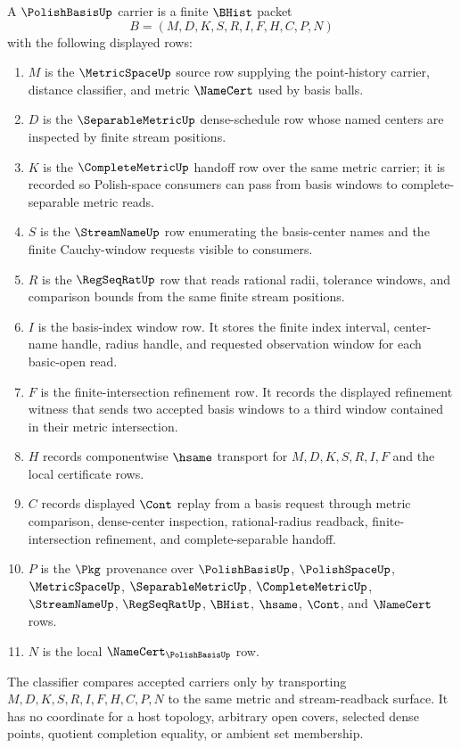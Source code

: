 \begin{definition}
\label{def:polish-basis-carrier}
A $\PolishBasisUp$ carrier is a finite $\BHist$ packet
$$
B=(M,D,K,S,R,I,F,H,C,P,N)
$$
with the following displayed rows:
\begin{enumerate}
\item $M$ is the $\MetricSpaceUp$ source row supplying the point-history carrier, distance classifier, and metric $\NameCert$ used by basis balls.
\item $D$ is the $\SeparableMetricUp$ dense-schedule row whose named centers are inspected by finite stream positions.
\item $K$ is the $\CompleteMetricUp$ handoff row over the same metric carrier; it is recorded so Polish-space consumers can pass from basis windows to complete-separable metric reads.
\item $S$ is the $\StreamNameUp$ row enumerating the basis-center names and the finite Cauchy-window requests visible to consumers.
\item $R$ is the $\RegSeqRatUp$ row that reads rational radii, tolerance windows, and comparison bounds from the same finite stream positions.
\item $I$ is the basis-index window row. It stores the finite index interval, center-name handle, radius handle, and requested observation window for each basic-open read.
\item $F$ is the finite-intersection refinement row. It records the displayed refinement witness that sends two accepted basis windows to a third window contained in their metric intersection.
\item $H$ records componentwise $\hsame$ transport for $M,D,K,S,R,I,F$ and the local certificate rows.
\item $C$ records displayed $\Cont$ replay from a basis request through metric comparison, dense-center inspection, rational-radius readback, finite-intersection refinement, and complete-separable handoff.
\item $P$ is the $\Pkg$ provenance over $\PolishBasisUp$, $\PolishSpaceUp$, $\MetricSpaceUp$, $\SeparableMetricUp$, $\CompleteMetricUp$, $\StreamNameUp$, $\RegSeqRatUp$, $\BHist$, $\hsame$, $\Cont$, and $\NameCert$ rows.
\item $N$ is the local $\NameCert_{\PolishBasisUp}$ row.
\end{enumerate}
The classifier compares accepted carriers only by transporting $M,D,K,S,R,I,F,H,C,P,N$ to the same metric and stream-readback surface. It has no coordinate for a host topology, arbitrary open covers, selected dense points, quotient completion equality, or ambient set membership.
\end{definition}


